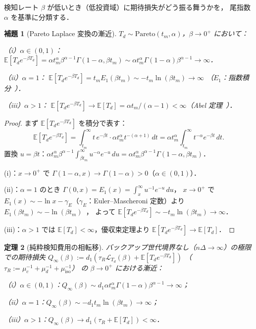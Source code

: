 \documentclass[12pt,a4paper]{article}
\theoremstyle{plain}
\newtheorem{theorem}{定理}[section]
\newtheorem{lemma}[theorem]{補題}
\theoremstyle{definition}
\theoremstyle{remark}
\newcommand{\E}{\mathbb{E}}
\newcommand{\calL}{\mathcal{L}}
\newcommand{\Qinf}{Q_{\infty}}
\begin{document}
検知レート $\beta$ が低いとき（低投資域）に期待損失がどう振る舞うかを，
尾指数 $\alpha$ を基準に分類する．

\begin{lemma}[Pareto Laplace 変換の漸近]\label{lem:laplace}
$T_d\sim\mathrm{Pareto}(t_m,\alpha)$，$\beta\to0^+$ において：

\noindent（i）$\alpha\in(0,1)$：
$\E[T_d e^{-\beta T_d}]=\alpha t_m^\alpha\beta^{\alpha-1}\Gamma(1-\alpha,\beta t_m)
\sim\alpha t_m^\alpha\Gamma(1-\alpha)\beta^{\alpha-1}\to\infty$．

\noindent（ii）$\alpha=1$：
$\E[T_d e^{-\beta T_d}]=t_m E_1(\beta t_m)\sim-t_m\ln(\beta t_m)\to\infty$
（$E_1$：指数積分~\cite{abramowitz1965,nist_dlmf}）．

\noindent（iii）$\alpha>1$：
$\E[T_d e^{-\beta T_d}]\to\E[T_d]=\alpha t_m/(\alpha-1)<\infty$（Abel 定理~\cite{feller1971}）．
\end{lemma}

\begin{proof}
まず $\E[T_d e^{-\beta T_d}]$ を積分で表す：
\[
\E[T_d e^{-\beta T_d}]
=\int_{t_m}^\infty t\,e^{-\beta t}\cdot\alpha t_m^\alpha t^{-(\alpha+1)}\,dt
=\alpha t_m^\alpha\int_{t_m}^\infty t^{-\alpha}e^{-\beta t}\,dt.
\]
置換 $u=\beta t$：$\alpha t_m^\alpha\beta^{\alpha-1}\int_{\beta t_m}^\infty u^{-\alpha}e^{-u}\,du
=\alpha t_m^\alpha\beta^{\alpha-1}\Gamma(1-\alpha,\beta t_m)$．

(i)：$x\to0^+$ で $\Gamma(1-\alpha,x)\to\Gamma(1-\alpha)>0$（$\alpha\in(0,1)$）．

(ii)：$\alpha=1$ のとき $\Gamma(0,x)=E_1(x)=\int_x^\infty u^{-1}e^{-u}\,du$，
$x\to0^+$ で $E_1(x)\sim-\ln x-\gamma_E$（$\gamma_E$：Euler--Mascheroni 定数）より
$E_1(\beta t_m)\sim-\ln(\beta t_m)$~\cite{abramowitz1965}，
よって $\E[T_d e^{-\beta T_d}]\sim-t_m\ln(\beta t_m)\to\infty$．

(iii)：$\alpha>1$ では $\E[T_d]<\infty$，優収束定理より $\E[T_d e^{-\beta T_d}]\to\E[T_d]$．
\end{proof}

\begin{theorem}[純粋検知費用の相転移]\label{thm:q_inf}
バックアップ世代境界なし（$n\Delta\to\infty$）の極限での期待損失
$\Qinf(\beta):=d_1(\tau_R\calL_{T_d}(\beta)+\E[T_d e^{-\beta T_d}])$
（$\tau_R:=\mu_c^{-1}+\mu_d^{-1}+\mu_{\mathrm{iso}}^{-1}$）
の $\beta\to0^+$ における漸近：

\noindent（i）$\alpha\in(0,1)$：$\Qinf(\beta)\sim d_1\alpha t_m^\alpha\Gamma(1-\alpha)\beta^{\alpha-1}\to\infty$；

\noindent（ii）$\alpha=1$：$\Qinf(\beta)\sim-d_1 t_m\ln(\beta t_m)\to\infty$；

\noindent（iii）$\alpha>1$：$\Qinf(\beta)\to d_1(\tau_R+\E[T_d])<\infty$．
\end{theorem}
\end{document}

